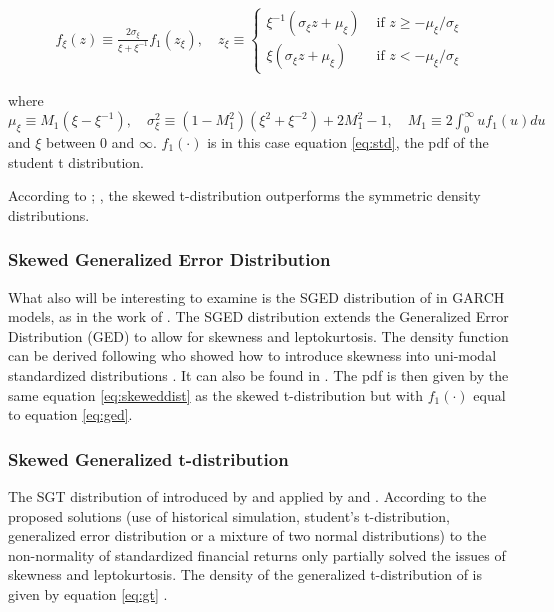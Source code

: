 \documentclass[a4paper, twoside]{templates/ociamthesis}
\begin{document}
\begin{align}
f_{\xi}(z) \equiv \frac{2 \sigma_{\xi}}{\xi+\xi^{-1}} f_{1}\left(z_{\xi}\right), \quad z_{\xi} \equiv\left\{\begin{array}{ll}
\xi^{-1}\left(\sigma_{\xi} z+\mu_{\xi}\right) & \text { if } z \geq-\mu_{\xi} / \sigma_{\xi} \\
\xi\left(\sigma_{\xi} z+\mu_{\xi}\right) & \text { if } z<-\mu_{\xi} / \sigma_{\xi}
\end{array}\right.
 \label{eq:skeweddist}
\end{align}

where \(\mu_{\xi} \equiv M_{1}\left(\xi-\xi^{-1}\right), \quad \sigma_{\xi}^{2} \equiv\left(1-M_{1}^{2}\right)\left(\xi^{2}+\xi^{-2}\right)+2 M_{1}^{2}-1, \quad M_{1} \equiv 2 \int_{0}^{\infty} u f_{1}(u) d u\) and \(\xi\) between \(0\) and \(\infty\). \(f_1(\cdot)\) is in this case equation \eqref{eq:std}, the pdf of the student t distribution.

According to \textcite{giot2003}; \textcite{giot2004}, the skewed t-distribution outperforms the symmetric density distributions.

\hypertarget{skewed-generalized-error-distribution}{%
\subsubsection{Skewed Generalized Error Distribution}\label{skewed-generalized-error-distribution}}

What also will be interesting to examine is the SGED distribution of \textcite{theodossiou2000} in GARCH models, as in the work of \textcite{lee2008}. The SGED distribution extends the Generalized Error Distribution (GED) to allow for skewness and leptokurtosis. The density function can be derived following \textcite{fernández1998} who showed how to introduce skewness into uni-modal standardized distributions \autocite{trottier2015}. It can also be found in \textcite{theodossiou2000}. The pdf is then given by the same equation \eqref{eq:skeweddist} as the skewed t-distribution but with \(f_1(\cdot)\) equal to equation \eqref{eq:ged}.

\hypertarget{skewed-generalized-t-distribution}{%
\subsubsection{Skewed Generalized t-distribution}\label{skewed-generalized-t-distribution}}

The SGT distribution of introduced by \textcite{theodossiou1998} and applied by \textcite{bali2007} and \textcite{bali2008}. According to \textcite{bali2008} the proposed solutions (use of historical simulation, student's t-distribution, generalized error distribution or a mixture of two normal distributions) to the non-normality of standardized financial returns only partially solved the issues of skewness and leptokurtosis. The density of the generalized t-distribution of \textcite{mcdonald1988} is given by equation \eqref{eq:gt} \autocite{bollerslev1994}.
\end{document}
